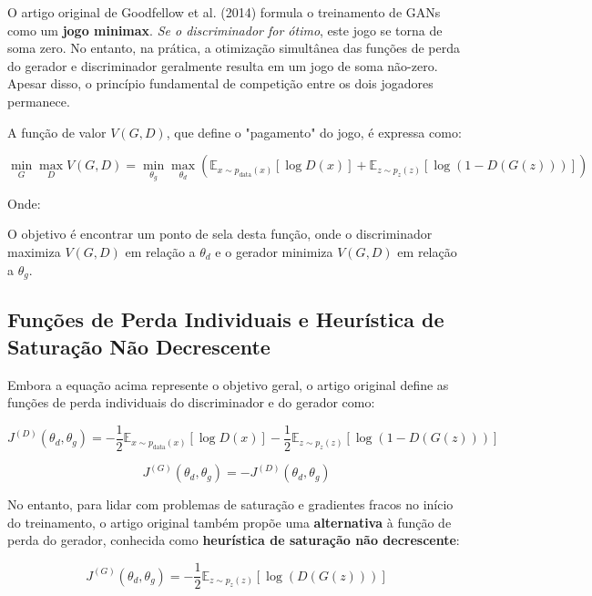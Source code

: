 \documentclass[a4paper]{tufte-handout}
\begin{document}
O artigo original de Goodfellow et al. (2014) formula o treinamento de GANs como um \textbf{jogo minimax}. \textit{Se o discriminador for ótimo}, este jogo se torna de soma zero. No entanto, na prática, a otimização simultânea das funções de perda do gerador e discriminador geralmente resulta em um jogo de soma não-zero. Apesar disso, o princípio fundamental de competição entre os dois jogadores permanece.

A função de valor $V(G, D)$, que define o "pagamento" do jogo, é expressa como:

\begin{equation*}
    \min_G \max_D V(G, D) = \min_{\theta_g} \max_{\theta_d} \left( \mathbb{E}_{x \sim p_{\text{data}}(x)} \left[ \log D(x) \right] + \mathbb{E}_{z \sim p_z(z)} \left[ \log (1 - D(G(z))) \right] \right)
\end{equation*}

Onde:



O objetivo é encontrar um ponto de sela desta função, onde o discriminador maximiza $V(G, D)$ em relação a $\theta_d$ e o gerador minimiza $V(G, D)$ em relação a $\theta_g$.

\subsection{Funções de Perda Individuais e Heurística de Saturação Não Decrescente}

Embora a equação acima represente o objetivo geral, o artigo original define as funções de perda individuais do discriminador e do gerador como:

\begin{equation*}
    J^{(D)}(\theta_d, \theta_g) = - \frac{1}{2} \mathbb{E}_{x \sim p_{\text{data}}(x)} \left[ \log D(x) \right] - \frac{1}{2} \mathbb{E}_{z \sim p_z(z)} \left[ \log (1 - D(G(z))) \right]
\end{equation*}

\begin{equation*}
    J^{(G)}(\theta_d, \theta_g) = - J^{(D)}(\theta_d, \theta_g)
\end{equation*}

No entanto, para lidar com problemas de saturação e gradientes fracos no início do treinamento, o artigo original também propõe uma \textbf{alternativa} à função de perda do gerador, conhecida como \textbf{heurística de saturação não decrescente}:

\begin{equation*}
    J^{(G)}(\theta_d, \theta_g) = - \frac{1}{2} \mathbb{E}_{z \sim p_z(z)} \left[ \log (D(G(z))) \right]
\end{equation*}
\end{document}

